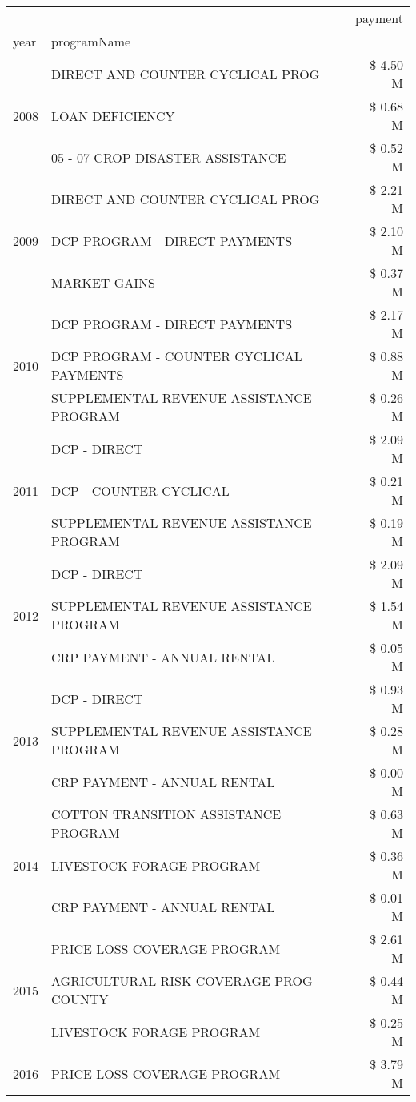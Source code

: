 \begin{tabular}{llr}
\toprule
 &  & payment \\
year & programName &  \\
\midrule
\multirow[t]{3}{*}{2008} & DIRECT AND COUNTER CYCLICAL PROG & \$ 4.50 M \\
 & LOAN DEFICIENCY & \$ 0.68 M \\
 & 05 - 07 CROP DISASTER ASSISTANCE & \$ 0.52 M \\
\cline{1-3}
\multirow[t]{3}{*}{2009} & DIRECT AND COUNTER CYCLICAL PROG & \$ 2.21 M \\
 & DCP PROGRAM - DIRECT PAYMENTS & \$ 2.10 M \\
 & MARKET GAINS & \$ 0.37 M \\
\cline{1-3}
\multirow[t]{3}{*}{2010} & DCP PROGRAM - DIRECT PAYMENTS & \$ 2.17 M \\
 & DCP PROGRAM - COUNTER CYCLICAL PAYMENTS & \$ 0.88 M \\
 & SUPPLEMENTAL REVENUE ASSISTANCE PROGRAM & \$ 0.26 M \\
\cline{1-3}
\multirow[t]{3}{*}{2011} & DCP - DIRECT & \$ 2.09 M \\
 & DCP - COUNTER CYCLICAL & \$ 0.21 M \\
 & SUPPLEMENTAL REVENUE ASSISTANCE PROGRAM & \$ 0.19 M \\
\cline{1-3}
\multirow[t]{3}{*}{2012} & DCP - DIRECT & \$ 2.09 M \\
 & SUPPLEMENTAL REVENUE ASSISTANCE PROGRAM & \$ 1.54 M \\
 & CRP PAYMENT - ANNUAL RENTAL & \$ 0.05 M \\
\cline{1-3}
\multirow[t]{3}{*}{2013} & DCP - DIRECT & \$ 0.93 M \\
 & SUPPLEMENTAL REVENUE ASSISTANCE PROGRAM & \$ 0.28 M \\
 & CRP PAYMENT - ANNUAL RENTAL & \$ 0.00 M \\
\cline{1-3}
\multirow[t]{3}{*}{2014} & COTTON TRANSITION ASSISTANCE PROGRAM & \$ 0.63 M \\
 & LIVESTOCK FORAGE PROGRAM & \$ 0.36 M \\
 & CRP PAYMENT - ANNUAL RENTAL & \$ 0.01 M \\
\cline{1-3}
\multirow[t]{3}{*}{2015} & PRICE LOSS COVERAGE PROGRAM & \$ 2.61 M \\
 & AGRICULTURAL RISK COVERAGE PROG - COUNTY & \$ 0.44 M \\
 & LIVESTOCK FORAGE PROGRAM & \$ 0.25 M \\
\cline{1-3}
\multirow[t]{3}{*}{2016} & PRICE LOSS COVERAGE PROGRAM                   & \$ 3.79 M \\

\end{tabular}
